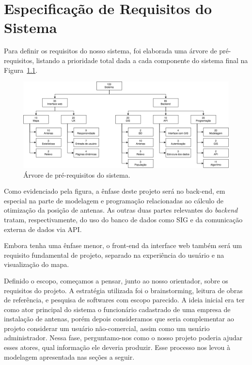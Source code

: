 \documentclass[]{politex}
\begin{document}
\chapter{Especificação de Requisitos do Sistema}
Para definir os requisitos do nosso sistema, foi elaborada uma árvore de
pré-requisitos, listando a prioridade total dada a cada componente do sistema
final na Figura~\ref{fig:arvore_prerequisitos}.

\begin{figure}[H]
  \centering
  \includegraphics[width=6in]{imagens/arvore_prerequisitos}
  \caption{Árvore de pré-requisitos do sistema.}
  \label{fig:arvore_prerequisitos}
\end{figure}

Como evidenciado pela figura, a ênfase deste projeto será no back-end, em
especial na parte de modelagem e programação relacionadas ao cálculo de
otimização da posição de antenas. As outras duas partes relevantes do 
\emph{backend} tratam, respectivamente, do uso do banco de dados como SIG e da
comunicação externa de dados via API.

Embora tenha uma ênfase menor, o front-end da interface web também será
um requisito fundamental de projeto, separado na experiência do usuário e na
visualização do mapa.

Definido o escopo, começamos a pensar, junto ao nosso orientador, sobre os 
requisitos do projeto. A estratégia utilizada foi o brainstorming, leitura de 
obras de referência, e pesquisa de softwares com escopo parecido.
A ideia inicial era ter como ator principal do sistema o funcionário cadastrado
de uma empresa de instalação de antenas, porém depois consideramos que seria
complementar ao projeto considerar um usuário não-comercial, assim
como um usuário administrador. Nessa fase, perguntamo-nos como o nosso projeto
poderia ajudar esses atores, qual informação ele deveria produzir. Esse processo
nos levou à modelagem apresentada nas seções a seguir.
\end{document}
